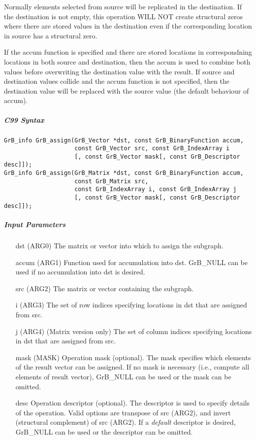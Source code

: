 Normally elements selected from source will be replicated in the destination.  If the
destination is not empty, this operation WILL NOT create structural zeros where there
are stored values in the destination even if the corresponding location in source 
has a structural zero.

If the {\sf accum} function is specified and there are stored locations in correspondning
locations in both source and destination, then the
{\sf accum} is used to combine both values before overwriting the destination value
with the result.  If source and destination values collide and the {\sf accum} function is
not specified, then the destination value will be replaced with the source value (the
default behaviour of {\sf accum}).

\subparagraph{C99 Syntax}

\begin{verbatim}
GrB_info GrB_assign(GrB_Vector *dst, const GrB_BinaryFunction accum,
                    const GrB_Vector src, const GrB_IndexArray i
                    [, const GrB_Vector mask[, const GrB_Descriptor desc]]);
GrB_info GrB_assign(GrB_Matrix *dst, const GrB_BinaryFunction accum,
                    const GrB_Matrix src,
                    const GrB_IndexArray i, const GrB_IndexArray j
                    [, const GrB_Vector mask[, const GrB_Descriptor desc]]);
\end{verbatim}

\subparagraph{Input Parameters}

\begin{itemize}
	\item[{\sf dst}]   ({\sf ARG0}) The matrix or vector into which to assign the subgraph.
	\item[{\sf accum}] ({\sf ARG1}) Function used for accumulation into dst.  {\sf GrB\_NULL}
                       can be used if no accumulation into dst is desired.
	\item[{\sf src}]   ({\sf ARG2}) The matrix or vector containing the subgraph.
	\item[{\sf i}]     ({\sf ARG3}) The set of row indices specifying locations in dst that
                       are assigned from src.
	\item[{\sf j}]     ({\sf ARG4}) (Matrix version only) The set of column indices specifying
                       locations in dst that are assigned from src.

	\item[{\sf mask}]  ({\sf MASK}) Operation mask (optional). The mask
	specifies which elements of the result vector can be assigned.
	If no mask is necessary (i.e., compute all elements of result
	vector), {\sf GrB\_NULL} can be used or the mask can be omitted.

	\item[{\sf desc}]  Operation descriptor (optional). The descriptor
    is used to specify details of the operation. Valid options are transpose
    of src ({\sf ARG2}), and invert (structural complement) of src ({\sf ARG2}). If
    a \emph{default} descriptor is desired,	{\sf GrB\_NULL} can be
    used or the descriptor can be omitted.
\end{itemize}

